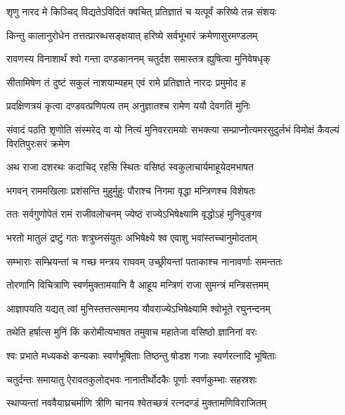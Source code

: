 \twolineshloka
{शृणु नारद मे किञ्चिद् विद्यतेऽविदितं क्वचित्}
{प्रतिज्ञातं च यत्पूर्वं करिष्ये तन्न संशयः} %

\twolineshloka
{किन्तु कालानुरोधेन तत्तत्प्रारब्धसङ्क्षयात्}
{हरिष्ये सर्वभूभारं क्रमेणासुरमण्डलम्} %

\twolineshloka
{रावणस्य विनाशार्थं श्वो गन्ता दण्डकाननम्}
{चतुर्दश समास्तत्र ह्युषित्वा मुनिवेषधृक्} %

\twolineshloka
{सीतामिषेण तं दुष्टं सकुलं नाशयाम्यहम्}
{एवं रामे प्रतिज्ञाते नारदः प्रमुमोद ह} %

\twolineshloka
{प्रदक्षिणत्रयं कृत्वा दण्डवत्प्रणिपत्य तम्}
{अनुज्ञातश्च रामेण ययौ देवगतिं मुनिः} %

\fourlineindentedshloka
{संवादं पठति शृणोति संस्मरेद् वा}
{यो नित्यं मुनिवररामयोः सभक्त्या}
{सम्प्राप्नोत्यमरसुदुर्लभं विमोक्षं}
{कैवल्यं विरतिपुरःसरं क्रमेण} %





\twolineshloka
{अथ राजा दशरथः कदाचिद् रहसि स्थितः}
{वसिष्ठं स्वकुलाचार्यमाहूयेदमभाषत} %

\twolineshloka
{भगवन् राममखिलाः प्रशंसन्ति मुहुर्मुहुः}
{पौराश्च निगमा वृद्धा मन्त्रिणश्च विशेषतः} %

\twolineshloka
{ततः सर्वगुणोपेतं रामं राजीवलोचनम्}
{ज्येष्ठं राज्येऽभिषेक्ष्यामि वृद्धोऽहं मुनिपुङ्गव} %

\twolineshloka
{भरतो मातुलं द्रष्टुं गतः शत्रुघ्नसंयुतः}
{अभिषेक्ष्ये श्व एवाशु भवांस्तच्चानुमोदताम्} %

\twolineshloka
{सम्भाराः सम्भ्रियन्तां च गच्छ मन्त्रय राघवम्}
{उच्छ्रीयन्तां पताकाश्च नानावर्णाः समन्ततः} %

\twolineshloka
{तोरणानि विचित्राणि स्वर्णमुक्तामयानि वै}
{आहूय मन्त्रिणं राजा सुमन्त्रं मन्त्रिसत्तमम्} %

\twolineshloka
{आज्ञापयति यद्यत् त्वां मुनिस्तत्तत्समानय}
{यौवराज्येऽभिषेक्ष्यामि श्वोभूते रघुनन्दनम्} %

\twolineshloka
{तथेति हर्षात्स मुनिं किं करोमीत्यभाषत}
{तमुवाच महातेजा वसिष्ठो ज्ञानिनां वरः} %

\twolineshloka
{श्वः प्रभाते मध्यकक्षे कन्यकाः स्वर्णभूषिताः}
{तिष्ठन्तु षोडश गजाः स्वर्णरत्नादि भूषिताः} %

\twolineshloka
{चतुर्दन्तः समायातु ऐरावतकुलोद्भवः}
{नानातीर्थोदकैः पूर्णाः स्वर्णकुम्भाः सहस्रशः} %

\twolineshloka
{स्थाप्यन्तां नववैयाघ्रचर्माणि त्रीणि चानय}
{श्वेतच्छत्रं रत्नदण्डं मुक्तामणिविराजितम्} %

